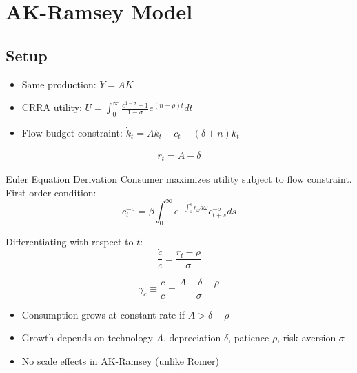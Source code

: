 \documentclass[a4paper,11pt]{article}
\begin{document}
\clearpage

\section{AK-Ramsey Model}

\subsection*{Setup}
\begin{itemize}
    \item Same production: $Y = AK$
    \item CRRA utility: $U = \int_0^\infty \frac{c^{1-\sigma}-1}{1-\sigma} e^{(n-\rho)t} dt$
    \item Flow budget constraint: $\dot{k}_t = Ak_t - c_t - (\delta + n)k_t$

\end{itemize}

\medskip

\begin{align*}
r_t = A - \delta \tag{MPK}
\end{align*}

\begin{derivationbox}{Euler Equation Derivation}
Consumer maximizes utility subject to flow constraint. First-order condition:
\[
c_t^{-\sigma} = \beta \int_0^\infty e^{-\int_0^s r_{\omega} d\omega} c_{t+s}^{-\sigma} ds
\]

Differentiating with respect to $t$:
\[
\frac{\dot{c}}{c} = \frac{r_t - \rho}{\sigma}
\]
\end{derivationbox}

\begin{resultbox}
\[
\boxed{\gamma_c \equiv \frac{\dot{c}}{c} = \frac{A - \delta - \rho}{\sigma}}
\tag{AK-Ramsey EE}
\]
\end{resultbox}

\medskip
\begin{tcolorbox}[colback=green!5,colframe=green3,title=Interpretation]
\begin{itemize}
    \item Consumption grows at constant rate if $A > \delta + \rho$
    \item Growth depends on technology $A$, depreciation $\delta$, patience $\rho$, risk aversion $\sigma$
    \item No scale effects in AK-Ramsey (unlike Romer)
\end{itemize}
\end{tcolorbox}
\end{document}
